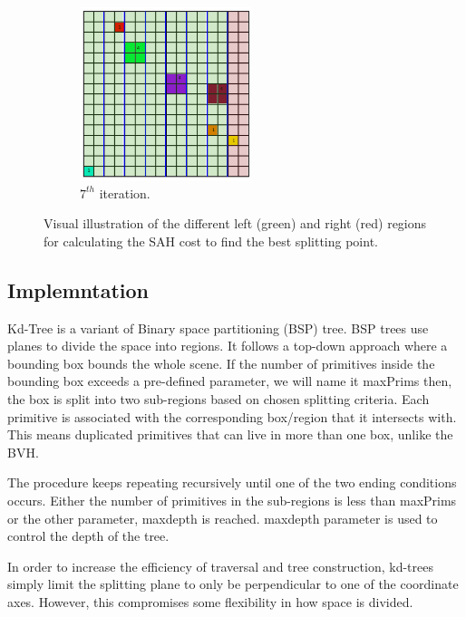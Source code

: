 \documentclass[11pt,a4paper]{article}
\begin{document}
\begin{figure}[H]
\begin{subfigure}[b]{0.475\textwidth}
         \centering
         \includegraphics[width=5cm]{images/kdtree/grid_8.png}
         \caption{$7^{th} $ iteration.}
         \label{fig:pi_18000}
     \end{subfigure}
        \captionsetup{justification=centering,margin=2cm}
        \caption{Visual illustration of the different left (green) and right (red) regions for calculating the SAH cost to find the best splitting point. }
        \label{fig:three graphs}
\end{figure}



\subsection{Implemntation}

Kd-Tree is a variant of Binary space partitioning (BSP) tree. BSP trees use planes to divide the space into regions. It follows a top-down approach where a bounding box bounds the whole scene. If the number of primitives inside the bounding box exceeds a pre-defined parameter, we will name it maxPrims then, the box is split into two sub-regions based on chosen splitting criteria. Each primitive is associated with the corresponding box/region that it intersects with. This means duplicated primitives that can live in more than one box, unlike the BVH.
\\
\noindent

The procedure keeps repeating recursively until one of the two ending conditions occurs. Either the number of primitives in the sub-regions is less than maxPrims or the other parameter, maxdepth is reached. maxdepth parameter is used to control the depth of the tree. 
\\
\noindent

In order to increase the efficiency of traversal and tree construction, kd-trees simply limit the splitting plane to only be perpendicular to one of the coordinate axes. However, this compromises some flexibility in how space is divided.
\end{document}
